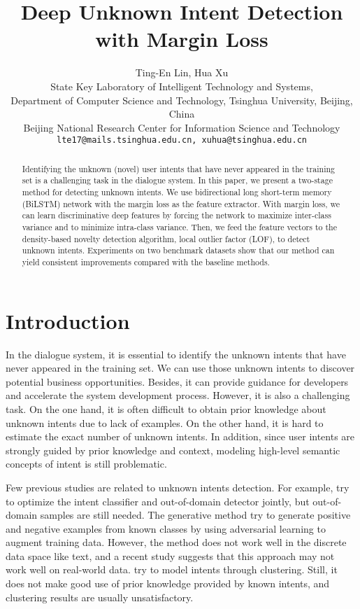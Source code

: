 \documentclass[11pt,a4paper]{article}
\title{Deep Unknown Intent Detection with Margin Loss}
\author{Ting-En Lin, Hua Xu \\
  State Key Laboratory of Intelligent Technology and Systems, \\
 Department of Computer Science and Technology, Tsinghua University, Beijing, China \\
  Beijing National Research Center for Information Science and Technology \\
{\tt lte17@mails.tsinghua.edu.cn, xuhua@tsinghua.edu.cn} \\ }
\date{}
\begin{document}
\maketitle
\begin{abstract}
Identifying the unknown (novel) user intents that have never appeared in the training set is a challenging task in the dialogue system. In this paper, we present a two-stage method for detecting unknown intents. We use bidirectional long short-term memory (BiLSTM) network with the margin loss as the feature extractor. With margin loss, we can learn discriminative deep features by forcing the network to maximize inter-class variance and to minimize intra-class variance. Then, we feed the feature vectors to the density-based novelty detection algorithm, local outlier factor (LOF), to detect unknown intents. Experiments on two benchmark datasets show that our method can yield consistent improvements compared with the baseline methods.
\end{abstract}

\section{Introduction}
In the dialogue system, it is essential to identify the unknown intents that have never appeared in the training set. We can use those unknown intents to discover potential business opportunities. Besides, it can provide guidance for developers and accelerate the system development process. However, it is also a challenging task. On the one hand, it is often difficult to obtain prior knowledge about unknown intents due to lack of examples. On the other hand, it is hard to estimate the exact number of unknown intents. In addition, since user intents are strongly guided by prior knowledge and context, modeling high-level semantic concepts of intent is still problematic.

Few previous studies are related to unknown intents detection. For example, \citet{Kim2018JointLO} try to optimize the intent classifier and out-of-domain detector jointly, but out-of-domain samples are still needed. The generative method \cite{Yu2017OpenCategoryCB} try to generate positive and negative examples from known classes by using adversarial learning to augment training data. However, the method does not work well in the discrete data space like text, and a recent study \cite{2018arXiv181009136N} suggests that this approach may not work well on real-world data. \citet{Brychcin2017UnsupervisedDA} try to model intents through clustering. Still, it does not make good use of prior knowledge provided by known intents, and clustering results are usually unsatisfactory.
\end{document}
